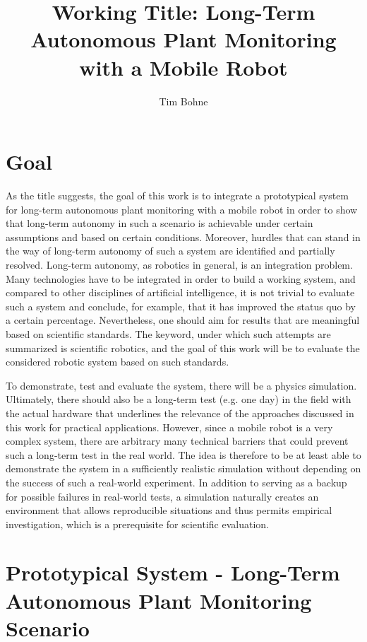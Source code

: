 \documentclass[german, master, expose, latin1]{base/thesis_KBS}
\begin{document}
\title{Working Title: Long-Term Autonomous Plant Monitoring with a Mobile Robot}
\author{Tim Bohne}

\generatetitle

\section{Goal}

As the title suggests, the goal of this work is to integrate a prototypical system for long-term autonomous plant monitoring with a mobile robot
in order to show that long-term autonomy in such a scenario is achievable under certain assumptions and based on certain conditions.
Moreover, hurdles that can stand in the way of long-term autonomy of such a system are identified and partially resolved.
Long-term autonomy, as robotics in general, is an integration problem. Many technologies have to be integrated in order to build a working system, and compared to
other disciplines of artificial intelligence, it is not trivial to evaluate such a system and conclude, for example, that it has improved the status quo by a certain percentage.
Nevertheless, one should aim for results that are meaningful based on scientific standards. The keyword, under which such attempts are summarized is scientific robotics,
and the goal of this work will be to evaluate the considered robotic system based on such standards.\newline

To demonstrate, test and evaluate the system, there will be a physics simulation. Ultimately, there should also be a long-term test (e.g. one day) in the field with the
actual hardware that underlines the relevance of the approaches discussed in this work for practical applications.
However, since a mobile robot is a very complex system, there are arbitrary many technical barriers that could prevent such a long-term test in the real world.
The idea is therefore to be at least able to demonstrate the system in a sufficiently realistic simulation without depending on the success of such a real-world experiment.
In addition to serving as a backup for possible failures in real-world tests, a simulation naturally creates an environment that allows reproducible situations and thus
permits empirical investigation, which is a prerequisite for scientific evaluation.

\section{Prototypical System - Long-Term Autonomous Plant Monitoring Scenario}
\end{document}
